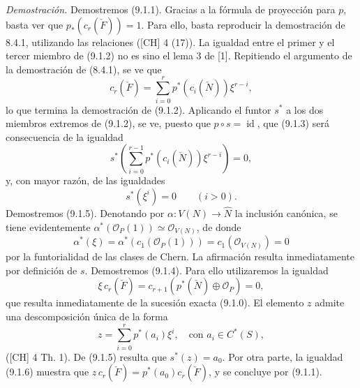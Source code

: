\emph{Demostración.} Demostremos (9.1.1). Gracias a la fórmula de proyección para $p$, basta ver que $p_*(c_r(\check F))=1$. Para ello, basta reproducir la demostración de 8.4.1, utilizando las relaciones ([CH] 4 (17)). La igualdad entre el primer y el tercer miembro de (9.1.2) no es sino el lema 3 de [1]. Repitiendo el argumento de la demostración de (8.4.1), se ve que
\[
c_r(\check F)=\sum_{i=0}^r p^*(c_i(\check N))\xi^{r-i},
\tag{9.1.2 bis}
\]
lo que termina la demostración de (9.1.2). Aplicando el funtor $s^*$ a los dos miembros extremos de (9.1.2), se ve, puesto que $p\circ s=\operatorname{id}$, que (9.1.3) será consecuencia de la igualdad
\[
s^*\left(\sum_{i=0}^{r-1}p^*(c_i(\check N))\xi^{r-i}\right)=0,
\]
y, con mayor razón, de las igualdades
\[
s^*(\xi^i)=0\qquad(i>0).
\tag{9.1.5}
\]
Demostremos (9.1.5). Denotando por $\alpha:V(N)\to\widehat N$ la inclusión canónica, se tiene evidentemente $\alpha^*(\mathcal O_P(1))\simeq\mathcal O_{V(N)}$, de donde
\[
\alpha^*(\xi)=\alpha^*(c_1(\mathcal O_P(1)))=c_1(\mathcal O_{V(N)})=0
\]
por la funtorialidad de las clases de Chern. La afirmación resulta inmediatamente por definición de $s$. Demostremos (9.1.4). Para ello utilizaremos la igualdad
\[
\xi\,c_r(\check F)=c_{r+1}(p^*(\check N)\oplus\mathcal O_P)=0,
\tag{9.1.6}
\]
que resulta inmediatamente de la sucesión exacta (9.1.0). El elemento $z$ admite una descomposición única de la forma
\[
z=\sum_{i=0}^r p^*(a_i)\xi^i,\quad\text{con }a_i\in C^*(S),
\]
([CH] 4 Th. 1). De (9.1.5) resulta que $s^*(z)=a_0$. Por otra parte, la igualdad (9.1.6) muestra que $z\,c_r(\check F)=p^*(a_0)c_r(\check F)$, y se concluye por (9.1.1).
